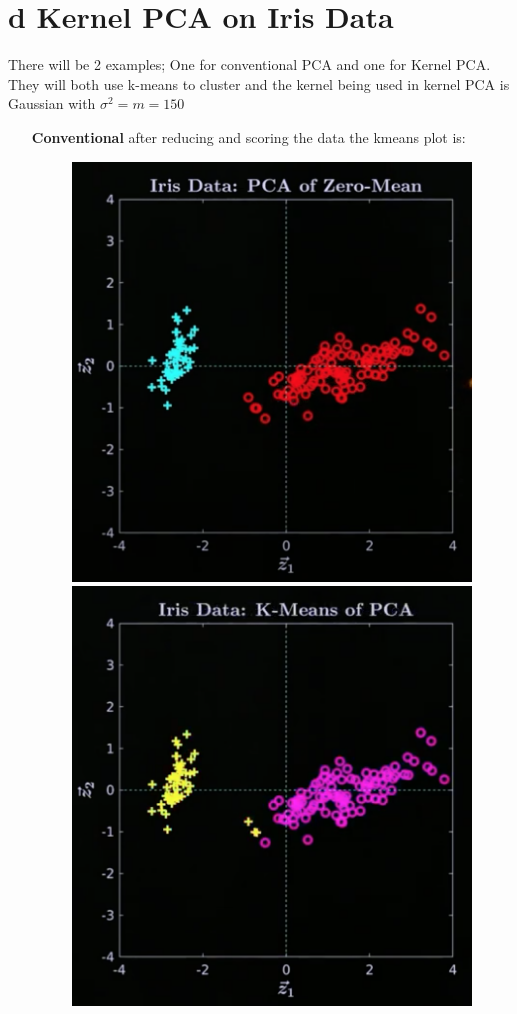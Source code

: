 \documentclass[12pt]{book}
\begin{document}
\section*{d Kernel PCA on Iris Data}
There will be 2 examples; One for conventional PCA and one for Kernel
PCA. They will both use k-means to cluster and the kernel being used
in kernel PCA is Gaussian with $\sigma^2 = m = 150$
\begin{itemize}
        \item[\textbf{Conventional}] after reducing and scoring the
                data the kmeans plot is:
                \begin{figure}[h]
                        \centering
                        \includegraphics[scale=0.4]{./figures/data1}
                        \includegraphics[scale=0.4]{./figures/kmean1}
                \end{figure}


\end{itemize}
\end{document}
